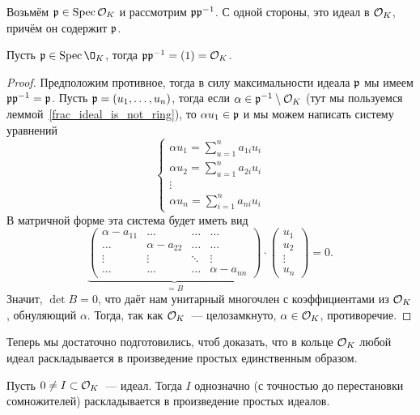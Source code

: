 	Возьмём $\mathfrak{p} \in \operatorname{Spec}{\mathcal{O}_{K}}$ и рассмотрим $\mathfrak{p} \mathfrak{p}^{-1}$. С одной стороны, это идеал в $\mathcal{O}_{K}$, причём он содержит $\mathfrak{p}$.

	\begin{lemma}\label{p p^{-1} = (1)} 
		Пусть $\fp \in \Spec{\O_{K}}$, тогда $\mathfrak{p} \mathfrak{p}^{-1} = (1) = \mathcal{O}_{K}$.
	\end{lemma}
	\begin{proof}
		Предположим противное, тогда в силу максимальности идеала $\mathfrak{p}$ мы имеем $\mathfrak{p} \mathfrak{p}^{-1} = \mathfrak{p}$. 
		Пусть $\mathfrak{p} = (u_{1}, \ldots, u_{n})$, тогда если $\alpha \in \mathfrak{p}^{-1} \setminus \mathcal{O}_{K}$ (тут мы пользуемся леммой~\ref{frac_ideal_is_not_ring}), то $\alpha u_{1} \in \mathfrak{p}$ и мы можем написать систему уравнений 
		\[
			\begin{cases} \alpha u_{1} = \sum\limits_{u = 1}^{n} a_{1 i} u_{i}   \\
			\alpha u_{2} = \sum\limits_{u = 1}^{n} a_{2 i} u_{i} \\ 
			\vdots \\ 
			\alpha u_{n} = \sum\limits_{i = 1}^{n} a_{n i} u_{i} \end{cases}
		\]
		В матричной форме эта система будет иметь вид 
		\[
			\underbrace{\begin{pmatrix} \alpha - a_{11} & \ldots & \ldots & \ldots \\ \ldots & \alpha - a_{22} & \ldots & \ldots \\ \vdots & \vdots & \ddots & \vdots \\ \ldots & \ldots & \ldots & \alpha - a_{nn} \end{pmatrix}}_{= B} \cdot \begin{pmatrix} u_{1} \\ u_{2} \\ \vdots \\ u_{n} \end{pmatrix} = 0.
		\]
		Значит, $\det{B} = 0$, что даёт нам унитарный многочлен с коэффициентами из $\mathcal{O}_{K}$, обнуляющий $\alpha$. Тогда, так как $\mathcal{O}_{K}$~--- целозамкнуто, $\alpha \in \mathcal{O}_{K}$, противоречие. 
	\end{proof}

	Теперь мы достаточно подготовились, чтоб доказать, что в кольце $\mathcal{O}_{K}$ любой идеал раскладывается в произведение простых единственным образом. 

	\begin{theorem}\label{ideal_factorization}
		Пусть $0 \neq I \subset \mathcal{O}_{K}$~--- идеал. Тогда $I$ однозначно (с точностью до перестановки сомножителей) раскладывается в произведение простых идеалов. 
	\end{theorem}

